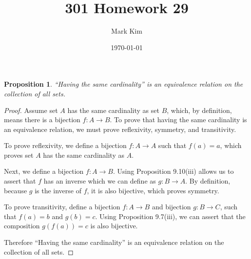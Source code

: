\documentclass[12pt]{amsart}
\title{301 Homework 29}
\author{Mark Kim}
\date{\today}
\newtheorem*{proposition}{Proposition}
\begin{document}
\maketitle

\begin{proposition}
``Having the same cardinality'' is an equivalence relation on the collection of all sets.
\end{proposition}

\begin{proof}
Assume set $A$ has the same cardinality as set $B$, which, by definition, means there is a bijection $f\colon A\rightarrow B$.  To prove that having the same cardinality is an equivalence relation, we must prove reflexivity, symmetry, and transitivity.

To prove reflexivity, we define a bijection $f\colon A\rightarrow A$ such that $f(a)=a$, which proves set $A$ has the same cardinality as $A$.

Next, we define a bijection $f\colon A\rightarrow B$.  Using Proposition 9.10(iii) allows us to assert that $f$ has an inverse which we can define as $g\colon B\rightarrow A$.  By definition, because $g$ is the inverse of $f$, it is also bijective, which proves symmetry.

To prove transitivity, define a bijection $f\colon A\rightarrow B$ and bijection $g\colon B\rightarrow C$, such that $f(a) = b$ and $g(b) = c$.  Using Proposition 9.7(iii),  we can assert that the composition $g(f(a)) = c$ is also bijective.

Therefore ``Having the same cardinality'' is an equivalence relation on the collection of all sets.
\end{proof}
\end{document}
